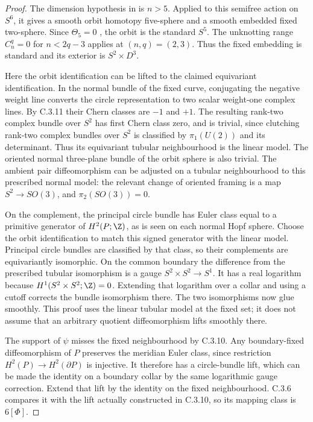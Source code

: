 \begin{proof}
The dimension hypothesis in
\citet[Section 1, Propositions 1.3--1.4]{FintushelPao1983D}
is $n>5$. Applied to this semifree action on $S^6$, it gives a
smooth orbit homotopy five-sphere and a smooth embedded fixed
two-sphere. Since $\Theta_5=0$ \citep{KervaireMilnor1963}, the
orbit is the standard $S^5$. The unknotting range
$C_n^q=0$ for $n<2q-3$
\citep[Corollary 6.6]{Haefliger1966D} applies at $(n,q)=(2,3)$.
Thus the fixed embedding is standard and its exterior is
$S^2\times D^3$.

Here the orbit identification can be lifted to the claimed
equivariant identification. In the normal bundle of the fixed
curve, conjugating the negative weight line converts the circle
representation to two scalar weight-one complex lines. By
C.3.11 their Chern classes are $-1$ and $+1$. The resulting
rank-two complex bundle over $S^2$ has first Chern class zero,
and is trivial, since clutching rank-two complex bundles over
$S^2$ is classified by $\pi_1(U(2))$ and its determinant.
Thus its equivariant tubular neighbourhood is the linear model.
The oriented normal three-plane bundle of the orbit sphere is
also trivial. The ambient pair diffeomorphism can be adjusted
on a tubular neighbourhood to this prescribed normal model:
the relevant change of oriented framing is a map
$S^2\to SO(3)$, and $\pi_2(SO(3))=0$.

On the complement, the principal circle bundle has Euler class
equal to a primitive generator of $H^2(P;\Z)$, as is seen on
each normal Hopf sphere. Choose the orbit identification to
match this signed generator with the linear model. Principal
circle bundles are classified by that class, so their complements
are equivariantly isomorphic. On the common boundary the
difference from the prescribed tubular isomorphism is a gauge
$S^2\times S^2\to S^1$. It has a real logarithm because
$H^1(S^2\times S^2;\Z)=0$. Extending that logarithm over a
collar and using a cutoff corrects the bundle isomorphism there.
The two isomorphisms now glue smoothly. This proof uses the
linear tubular model at the fixed set; it does not assume that
an arbitrary quotient diffeomorphism lifts smoothly there.

The support of $\psi$ misses the fixed neighbourhood by C.3.10.
Any boundary-fixed diffeomorphism of $P$ preserves the meridian
Euler class, since restriction $H^2(P)\to H^2(\partial P)$ is
injective. It therefore has a circle-bundle lift, which can be
made the identity on a boundary collar by the same logarithmic
gauge correction. Extend that lift by the identity on the fixed
neighbourhood. C.3.6 compares it with the lift actually constructed
in C.3.10, so its mapping class is $6[\Phi]$.


\end{proof}
